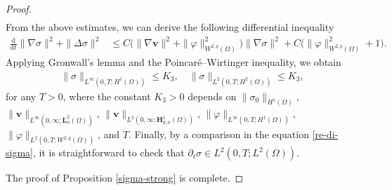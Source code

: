 \documentclass[10pt,a4paper]{amsart}
\def\H{\bm{H}}
\def\L{\bm{L}}
\def\vv{\bm{v}}
\begin{document}
\begin{proof}
\begin{equation*}
\begin{aligned}
\end{aligned}
\end{equation*}
%
From the above estimates, we can derive the following differential inequality
%
\begin{equation}
\begin{aligned}
\frac{\mathrm{d}}{\mathrm{d} t} \|\nabla \sigma\|^2 + \|\Delta\sigma\|^2
&\le C\big(\|\nabla \vv \|^2+\|\varphi\|_{W^{2,q}(\Omega)}^2\big) \|\nabla \sigma\|^2
+ C\big(\|\varphi\|_{W^{2,q}(\Omega)}^2+1\big).
\end{aligned}
\label{es-sigH0}
\end{equation}
%
Applying Gronwall's lemma and the Poincar\'{e}--Wirtinger inequality, we obtain
%
\begin{align}
\|\sigma\|_{L^\infty(0,T;H^1(\Omega))}\leq K_3,\quad \|\sigma\|_{L^2(0,T;H^2(\Omega))}\leq K_3,
\label{es-sigH1}
\end{align}
%
for any $T>0$, where the constant $K_3>0$ depends on $\|\sigma_0\|_{H^1(\Omega)}$,
$\|\vv\|_{L^\infty(0,\infty;\L^2_{\sigma}(\Omega))}$, $\|\vv\|_{L^2(0,\infty;\H^1_{0,\sigma}(\Omega))}$,
$\|\varphi \|_{L^\infty(0,T;H^1(\Omega))}$, $\|\varphi\|_{L^2(0,T;W^{2,q}(\Omega))}$, and $T$. Finally, by a comparison in the equation \eqref{re-di-sigma}, it is straightforward to check that $\partial_t\sigma \in L^2(0,T;L^2(\Omega))$.

The proof of Proposition \ref{sigma-strong} is complete.
\end{proof}
\end{document}
